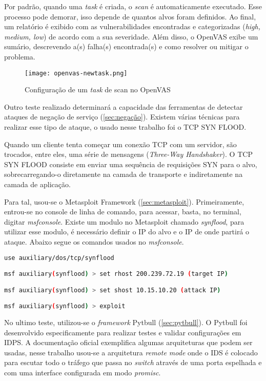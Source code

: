 Por padrão, quando uma \textit{task} é criada, o \textit{scan} é automaticamente executado. Esse processo pode demorar, isso depende de quantos alvos foram definidos. Ao final, um relatório é exibido com as vulnerabilidades encontradas e categorizadas (\textit{high, medium, low}) de acordo com a sua severidade. Além disso, o OpenVAS exibe um sumário, descrevendo a(s) falha(s) encontrada(s) e como resolver ou mitigar o problema.

\begin{figure}[!htb]
\centering
\caption{Configuração de um \textit{task} de scan no OpenVAS}
\texttt{[image: openvas-newtask.png]}
\label{fig:openvas-newtask}
\end{figure}

Outro teste realizado determinará a capacidade das ferramentas de detectar ataques de negação de serviço (\autoref{sec:negação}). Existem várias técnicas para realizar esse tipo de ataque, o usado nesse trabalho foi o TCP SYN FLOOD. 

Quando um cliente tenta começar um conexão TCP com um servidor, são trocados, entre eles, uma série de mensagens (\textit{Three-Way Handshaker}). O TCP SYN FLOOD consiste em enviar uma sequência de requisições SYN para o alvo, sobrecarregando-o diretamente na camada de transporte e indiretamente na camada de aplicação.

Para tal, usou-se o Metasploit Framework (\autoref{sec:metasploit}). Primeiramente, entrou-se no console de linha de comando, para acessar, basta, no terminal, digitar \textit{msfconsole}. Existe um modulo no Metasploit chamado \textit{synflood}, para utilizar esse modulo, é necessário definir o IP do alvo e o IP de onde partirá o ataque. Abaixo segue os comandos usados no \textit{msfconsole}.

\begin{lstlisting}[caption={Comando usados no Metasploit para ataque de negação de serviço},language=bash, frame=single, label={lst:synflood}]
use auxiliary/dos/tcp/synflood

msf auxiliary(synflood) > set rhost 200.239.72.19 (target IP)

msf auxiliary(synflood) > set shost 10.15.10.20 (attack IP)

msf auxiliary(synflood) > exploit
\end{lstlisting}

No ultimo teste, utilizou-se o \textit{framework} Pytbull (\autoref{sec:pytbull}). O Pytbull foi desenvolvido especificamente para realizar testes e validar configurações em IDPS. A documentação oficial exemplifica algumas arquiteturas que podem ser usadas, nesse trabalho usou-se a arquitetura \textit{remote mode} onde o IDS é colocado para escutar todo o tráfego que passa no \textit{switch} através de uma porta espelhada e com uma interface configurada em modo \textit{promisc}.

